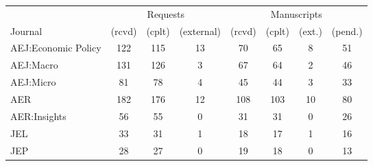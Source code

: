 
\begin{tabular}{@{\extracolsep{5pt}} lccccccc} 
\toprule 
        & \multicolumn{3}{c}{Requests} & \multicolumn{4}{c}{Manuscripts}\\
\cmidrule{2-4}\cmidrule{5-8}

Journal & (rcvd) & (cplt) & (external) & (rcvd) & (cplt) & (ext.) & (pend.) \\ 
AEJ:Economic Policy & 122 & 115 & 13 & 70 & 65 & 8 & 51 \\ 
AEJ:Macro & 131 & 126 & 3 & 67 & 64 & 2 & 46 \\ 
AEJ:Micro & 81 & 78 & 4 & 45 & 44 & 3 & 33 \\ 
AER & 182 & 176 & 12 & 108 & 103 & 10 & 80 \\ 
AER:Insights & 56 & 55 & 0 & 31 & 31 & 0 & 26 \\ 
JEL & 33 & 31 & 1 & 18 & 17 & 1 & 16 \\ 
JEP & 28 & 27 & 0 & 19 & 18 & 0 & 13 \\ 
\bottomrule 
\end{tabular} 
